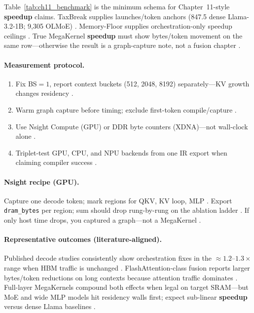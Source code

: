 Table~\ref{tab:ch11_benchmark} is the minimum schema for Chapter~11-style \textbf{speedup} claims. TaxBreak supplies launches/token anchors (847.5 dense Llama-3.2-1B; 9,305 OLMoE) \citep{taxbreak2026}. Memory-Floor supplies orchestration-only speedup ceilings \citep{memoryfloor2026}. True MegaKernel \textbf{speedup} must show bytes/token movement on the same row---otherwise the result is a graph-capture note, not a fusion chapter \citep{patel2025llminference,dao2022flashattention}.

\paragraph{Measurement protocol.}
\begin{enumerate}
\item Fix BS${=}1$, report context buckets (512, 2048, 8192) separately---KV growth changes residency \citep{dao2023flashdecoding,kwon2023vllm}.
\item Warm graph capture before timing; exclude first-token compile/capture \citep{nvidia2024cudagraphs,memoryfloor2026}.
\item Use Nsight Compute (GPU) or DDR byte counters (XDNA)---not wall-clock alone \citep{semianalysis2024tma,amd2024xdna}.
\item Triplet-test GPU, CPU, and NPU backends from one IR export when claiming compiler success \citep{yirage2026,chen2020compilerbasedhardw}.
\end{enumerate}

\paragraph{Nsight recipe (GPU).} Capture one decode token; mark regions for QKV, KV loop, MLP \citep{semianalysis2024tma,taxbreak2026}. Export \texttt{dram\_bytes} per region; sum should drop rung-by-rung on the ablation ladder \citep{memoryfloor2026,dao2022flashattention}. If only host time drops, you captured a graph---not a MegaKernel \citep{nvidia2024cudagraphs,memoryfloor2026,patel2025llminference,yirage2026,chen2020compilerbasedhardw}.

\paragraph{Representative outcomes (literature-aligned).} Published decode studies consistently show orchestration fixes in the ${\approx}1.2$--$1.3\times$ range when HBM traffic is unchanged \citep{memoryfloor2026,nvidia2024cudagraphs}. FlashAttention-class fusion reports larger bytes/token reductions on long contexts because attention traffic dominates \citep{dao2022flashattention,dao2023flashdecoding}. Full-layer MegaKernels compound both effects when legal on target SRAM---but MoE and wide MLP models hit residency walls first; expect sub-linear \textbf{speedup} versus dense Llama baselines \citep{taxbreak2026,liu2024deepseekv3}.


